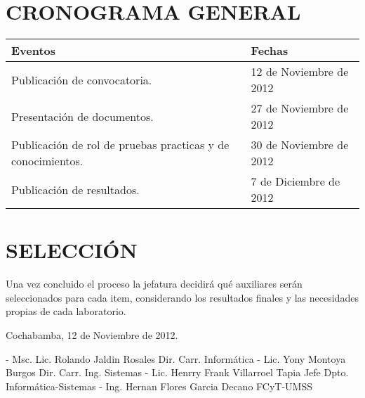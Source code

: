 \documentclass[letterpaper,11pt]{article}
\begin{document}
\section{CRONOGRAMA GENERAL}
\begin{tabular}{|l|l|}
\hline
 \textbf{Eventos} & \textbf{Fechas} \\
\hline
 Publicación de convocatoria. & 12 de Noviembre de 2012 \\
\hline
 Presentación de documentos. & 27 de Noviembre de 2012 \\
\hline
 Publicación de rol de pruebas practicas y de conocimientos. & 30 de Noviembre de 2012 \\
\hline
 Publicación de resultados. & 7 de Diciembre de 2012 \\
\hline
\end{tabular}

\section{SELECCIÓN}
Una vez concluido el proceso la jefatura decidirá qué auxiliares serán seleccionados para cada item, considerando los resultados finales y las necesidades propias de cada laboratorio.

Cochabamba, 12 de Noviembre de 2012.

- Msc. Lic. Rolando Jaldin Rosales
  Dir. Carr. Informática
- Lic. Yony Montoya Burgos
  Dir. Carr. Ing. Sistemas
- Lic. Henrry Frank Villarroel Tapia
  Jefe Dpto. Informática-Sistemas
- Ing. Hernan Flores Garcia
  Decano FCyT-UMSS
\end{document}
